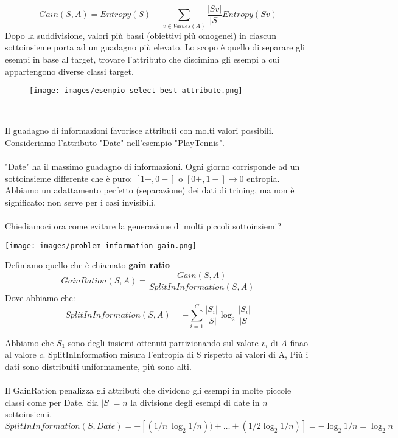 $$Gain(S, A) = Entropy(S) - \sum_{v \in Values(A)} \frac{|Sv|}{|S|} Entropy(Sv)$$
Dopo la suddivisione, valori più bassi (obiettivi più omogenei) in ciascun sottoinsieme porta ad un guadagno più elevato.
Lo scopo è quello di separare gli esempi in base al target, trovare l'attributo che discimina gli esempi a cui appartengono diverse classi target.
\begin{figure}[h!]
    \centering
    \texttt{[image: images/esempio-select-best-attribute.png]}
\end{figure}
\\
\begin{minipage}{0.65\linewidth}
    Il guadagno di informazioni favorisce attributi con molti valori possibili. Consideriamo l'attributo "Date" nell'esempio "PlayTennis".\\\\
    "Date" ha il massimo guadagno di informazioni. Ogni giorno corrisponde ad un sottoinsieme differente che è puro: $[1+, 0-]$ o $[0+, 1-] \to 0$ entropia. 
    Abbiamo un adattamento perfetto (separazione) dei dati di trining, ma non è significato: non serve per i casi invisibili. \\\\
    Chiediamoci ora come evitare la generazione di molti piccoli
    sottoinsiemi?    
\end{minipage}
\hfill
\begin{minipage}{0.35\linewidth}
    \centering
    \texttt{[image: images/problem-information-gain.png]}
\end{minipage}
\begin{definition}
    Definiamo quello che è chiamato \textbf{gain ratio}
    $$GainRation(S, A) = \frac{Gain(S, A)}{SplitInInformation(S, A)}$$
    Dove abbiamo che:
    $$SplitInInformation(S, A) = -\sum_{i=1}^{C}\frac{|S_i|}{|S|} \log_2\frac{|S_i|}{|S|}$$
\end{definition}
\hspace{-15pt}Abbiamo che $S_1$ sono degli insiemi ottenuti partizionando sul valore $v_i$ di $A$ finao al valore $c$.
SplitInInformation misura l'entropia di S rispetto ai valori di A, Più i dati sono distribuiti uniformamente, più sono alti.\\\\
Il GainRation penalizza gli attributi che dividono gli esempi in molte piccole classi come per Date.
Sia $|S| = n$ la divisione degli esempi di date in $n$ sottoinsiemi.
$$SplitInInformation(S, Date) = -[(1/n \:\log_2 1/n)) + \dots + (1/2 \log_2 1/n)] = -\log_2 1/n = \log_2n$$
